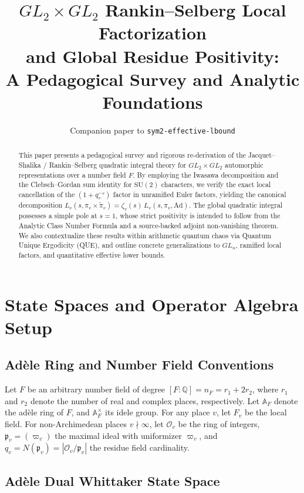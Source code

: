 \documentclass[12pt]{article}
\title{$GL_2 \times GL_2$ Rankin--Selberg Local Factorization\\
and Global Residue Positivity:\\
A Pedagogical Survey and Analytic Foundations}
\author{}
\date{Companion paper to \texttt{sym2-effective-lbound}}
\begin{document}
\maketitle

\begin{abstract}
This paper presents a pedagogical survey and rigorous re-derivation of the
Jacquet--Shalika / Rankin--Selberg quadratic integral theory for $GL_2 \times GL_2$
automorphic representations over a number field $F$. By employing the Iwasawa
decomposition and the Clebsch--Gordan sum identity for $\mathrm{SU}(2)$ characters,
we verify the exact local cancellation of the $(1 + q_v^{-s})$ factor in unramified
Euler factors, yielding the canonical decomposition
$L_v(s, \pi_v \times \tilde\pi_v) = \zeta_v(s)\, L_v(s, \pi_v, \mathrm{Ad})$.
The global quadratic integral possesses a simple pole at $s = 1$, whose strict
positivity is intended to follow from the Analytic Class Number Formula and a
source-backed adjoint non-vanishing theorem. We also contextualize these
results within arithmetic quantum chaos via Quantum Unique Ergodicity (QUE),
and outline concrete generalizations to $GL_n$, ramified local factors, and
quantitative effective lower bounds.
\end{abstract}

\tableofcontents

\section{State Spaces and Operator Algebra Setup}

\subsection{Ad\`ele Ring and Number Field Conventions}

Let $F$ be an arbitrary number field of degree $[F:\mathbb{Q}] = n_F = r_1 + 2r_2$,
where $r_1$ and $r_2$ denote the number of real and complex places, respectively.
Let $\mathbb{A}_F$ denote the ad\`ele ring of $F$, and $\mathbb{A}_F^\times$ its idele group.
For any place $v$, let $F_v$ be the local field.
For non-Archimedean places $v \nmid \infty$, let $\mathcal{O}_v$ be the ring of integers,
$\mathfrak{p}_v = (\varpi_v)$ the maximal ideal with uniformizer $\varpi_v$,
and $q_v = N(\mathfrak{p}_v) = |\mathcal{O}_v/\mathfrak{p}_v|$ the residue field cardinality.

\subsection{Ad\`ele Dual Whittaker State Space}
\end{document}
